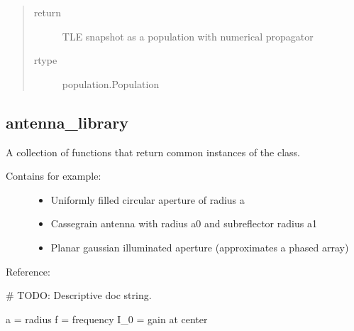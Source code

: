 \documentclass[letterpaper,10pt,english]{sphinxmanual}
\begin{document}
\begin{fulllineitems}
\begin{description}
\begin{quote}
\begin{description}
\item[{return}] \leavevmode
TLE snapshot as a population with numerical propagator

\item[{rtype}] \leavevmode
population.Population

\end{description}\end{quote}

\end{description}

\end{fulllineitems}



\subsection{antenna\_library}
\label{\detokenize{modules/antenna_library:module-antenna_library}}\label{\detokenize{modules/antenna_library:antenna-library}}\label{\detokenize{modules/antenna_library::doc}}
A collection of functions that return common instances of the {\hyperref[\detokenize{modules/antenna:antenna.BeamPattern}]{}} class.
\begin{description}
\item[{Contains for example:}] \leavevmode\begin{itemize}
\item {} 
Uniformly filled circular aperture of radius a

\item {} 
Cassegrain antenna with radius a0 and subreflector radius a1

\item {} 
Planar gaussian illuminated aperture (approximates a phased array)

\end{itemize}

\end{description}

Reference:

\begin{fulllineitems}
\label{\detokenize{modules/antenna_library:antenna_library.airy}}
\# TODO: Descriptive doc string.

a = radius
f = frequency
I\_0 = gain at center

\end{fulllineitems}
\end{document}
